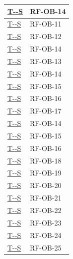 \documentclass[a4paper,12pt]{article}
\newcounter{testsys}
\newcommand{\systestref}{%
  \hyperlink{T-\arabic{testsys}-S}{T-\arabic{testsys}-S}%
}
\begin{document}
\begin{longtable}{|>{\centering\arraybackslash}p{5cm}|>{\centering\arraybackslash}p{9cm}|}
\stepcounter{testsys}
\systestref & RF-OB-14 \\
\hline

\stepcounter{testsys}
\systestref & RF-OB-11 \\
\hline

\stepcounter{testsys}
\systestref & RF-OB-12 \\
\hline

\stepcounter{testsys}
\systestref & RF-OB-14 \\
\hline

\stepcounter{testsys}
\systestref & RF-OB-13 \\
\hline

\stepcounter{testsys}
\systestref & RF-OB-14 \\
\hline

\stepcounter{testsys}
\systestref & RF-OB-15 \\
\hline

\stepcounter{testsys}
\systestref & RF-OB-16 \\
\hline

\stepcounter{testsys}
\systestref & RF-OB-17 \\
\hline

\stepcounter{testsys}
\systestref & RF-OB-14 \\
\hline

\stepcounter{testsys}
\systestref & RF-OB-15 \\
\hline

\stepcounter{testsys}
\systestref & RF-OB-16 \\
\hline

\stepcounter{testsys}
\systestref & RF-OB-18 \\
\hline

\stepcounter{testsys}
\systestref & RF-OB-19 \\
\hline

\stepcounter{testsys}
\systestref & RF-OB-20 \\
\hline

\stepcounter{testsys}
\systestref & RF-OB-21 \\
\hline

\stepcounter{testsys}
\systestref & RF-OB-22 \\
\hline

\stepcounter{testsys}
\systestref & RF-OB-23 \\
\hline

\stepcounter{testsys}
\systestref & RF-OB-24 \\
\hline

\stepcounter{testsys}
\systestref & RF-OB-25 \\
\hline


\end{longtable}
\end{document}
